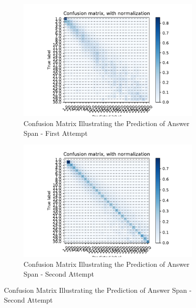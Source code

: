\begin{figure}[hbtp]
\begin{subfigure}{\textwidth}
        \includegraphics[width=\textwidth]{../Figures/confmat_stg2a.pdf}
        \caption{Confusion Matrix Illustrating the Prediction of Answer Span - First Attempt}
        \label{fig:confmat_stg2a}
    \end{subfigure}
    
    \begin{subfigure}{\textwidth}
        \includegraphics[width=\textwidth]{../Figures/confmat_stg2b.pdf}
        \caption{Confusion Matrix Illustrating the Prediction of Answer Span - Second Attempt}
        \label{fig:confmat_stg2b}
    \end{subfigure}
\end{figure}

